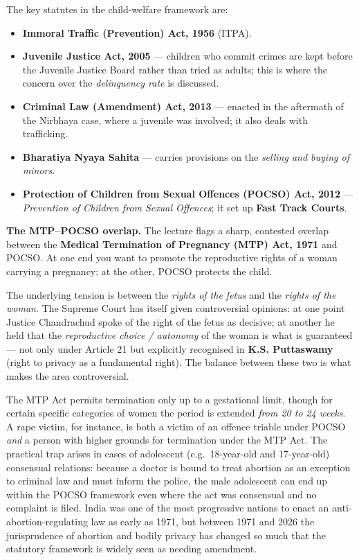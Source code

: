\begin{GovtPolicy}
The key statutes in the child-welfare framework are:
\begin{itemize}
  \item \textbf{Immoral Traffic (Prevention) Act, 1956} (ITPA).
  \item \textbf{Juvenile Justice Act, 2005} — children who commit crimes are kept before
        the Juvenile Justice Board rather than tried as adults; this is where the concern
        over the \emph{delinquency rate} is discussed.
  \item \textbf{Criminal Law (Amendment) Act, 2013} — enacted in the aftermath of the
        Nirbhaya case, where a juvenile was involved; it also deals with trafficking.
  \item \textbf{Bharatiya Nyaya Sahita} — carries provisions on the \emph{selling and
        buying of minors}.
  \item \textbf{Protection of Children from Sexual Offences (POCSO) Act, 2012} —
        \emph{Prevention of Children from Sexual Offences}; it set up \textbf{Fast Track
        Courts}.
\end{itemize}
\end{GovtPolicy}

\textbf{The MTP--POCSO overlap.} The lecture flags a sharp, contested overlap between
the \textbf{Medical Termination of Pregnancy (MTP) Act, 1971} and POCSO. At one end you
want to promote the reproductive rights of a woman carrying a pregnancy; at the other,
POCSO protects the child.

\begin{CriticalPoint}
The underlying tension is between the \emph{rights of the fetus} and the \emph{rights of
the woman}. The Supreme Court has itself given controversial opinions: at one point
Justice Chandrachud spoke of the right of the fetus as decisive; at another he held that
the \emph{reproductive choice / autonomy} of the woman is what is guaranteed — not only
under Article 21 but explicitly recognised in \textbf{K.S. Puttaswamy} (right to privacy
as a fundamental right). The balance between these two is what makes the area
controversial.
\end{CriticalPoint}

\begin{ExampleBox}
The MTP Act permits termination only up to a gestational limit, though for certain
specific categories of women the period is extended \emph{from 20 to 24 weeks}. A rape
victim, for instance, is both a victim of an offence triable under POCSO \emph{and} a
person with higher grounds for termination under the MTP Act. The practical trap arises
in cases of adolescent (e.g.\ 18-year-old and 17-year-old) consensual relations: because
a doctor is bound to treat abortion as an exception to criminal law and must inform the
police, the male adolescent can end up within the POCSO framework even where the act was
consensual and no complaint is filed. India was one of the most progressive nations to
enact an anti-abortion-regulating law as early as 1971, but between 1971 and 2026 the
jurisprudence of abortion and bodily privacy has changed so much that the statutory
framework is widely seen as needing amendment.
\end{ExampleBox}

